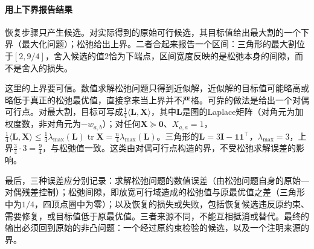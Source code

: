 \paragraph{用上下界报告结果}
恢复步骤只产生候选。对实际得到的原始可行候选，其目标值给出最大割的一个下界（最大化问题）；松弛给出上界。二者合起来报告一个区间：三角形的最大割位于$[2,9/4]$，舍入候选的值$2$恰为下端点，区间宽度反映的是松弛本身的间隙，而不是舍入的损失。

这里的上界要可信。数值求解松弛问题只得到近似解，近似解的目标值可能略高或略低于真正的松弛最优值，直接拿来当上界并不严格。可靠的做法是给出一个对偶可行点。对最大割，目标可写成$\frac14\langle\bm L,\bm X\rangle$，其中$\bm L$是图的Laplace矩阵（对角元为加权度数，非对角元为$-w_{a,b}$）；对任何$\bm X\succeq\bm0$、$X_{a,a}=1$，$\frac14\langle\bm L,\bm X\rangle\leq\frac14\lambda_{\max}(\bm L)\operatorname{tr}\bm X=\frac n4\lambda_{\max}(\bm L)$。三角形的$\bm L=3\bm I-\bm1\bm1^\top$，$\lambda_{\max}=3$，上界$\frac34\cdot3=\frac94$，与松弛值一致。这类由对偶可行点构造的界，不受松弛求解误差的影响。

最后，三种误差应分别记录：求解松弛问题的数值误差（由松弛问题自身的原始—对偶残差控制）；松弛间隙，即放宽可行域造成的松弛值与原最优值之差（三角形中为$1/4$，四顶点圈中为零）；以及恢复的损失或失败，包括恢复候选违反原约束、需要修复，或目标值低于原最优值。三者来源不同，不能互相抵消或替代。最终的输出必须回到原始的非凸问题：一个经过原约束检验的候选，以及一个注明来源的界。
